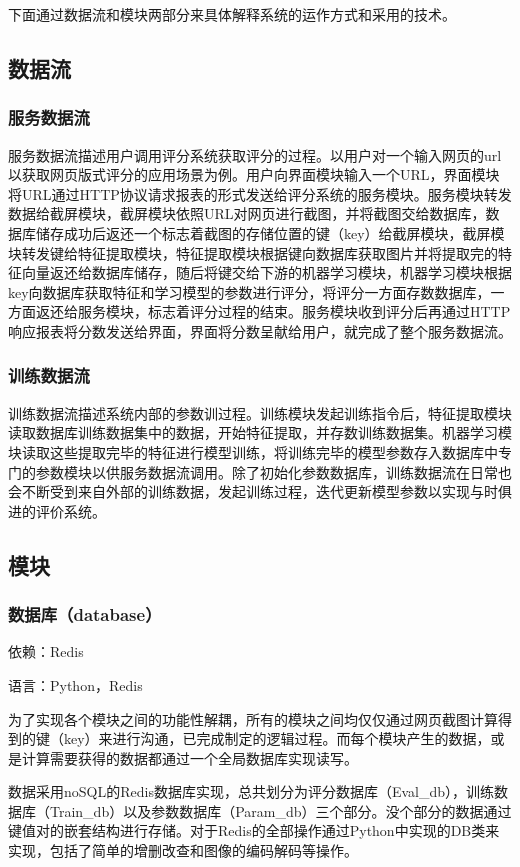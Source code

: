 下面通过数据流和模块两部分来具体解释系统的运作方式和采用的技术。

\subsection{数据流}

\subsubsection{服务数据流}
服务数据流描述用户调用评分系统获取评分的过程。以用户对一个输入网页的url以获取网页版式评分的应用场景为例。用户向界面模块输入一个URL，界面模块将URL通过HTTP协议请求报表的形式发送给评分系统的服务模块。服务模块转发数据给截屏模块，截屏模块依照URL对网页进行截图，并将截图交给数据库，数据库储存成功后返还一个标志着截图的存储位置的键（key）给截屏模块，截屏模块转发键给特征提取模块，特征提取模块根据键向数据库获取图片并将提取完的特征向量返还给数据库储存，随后将键交给下游的机器学习模块，机器学习模块根据key向数据库获取特征和学习模型的参数进行评分，将评分一方面存数数据库，一方面返还给服务模块，标志着评分过程的结束。服务模块收到评分后再通过HTTP响应报表将分数发送给界面，界面将分数呈献给用户，就完成了整个服务数据流。

\subsubsection{训练数据流}
训练数据流描述系统内部的参数训过程。训练模块发起训练指令后，特征提取模块读取数据库训练数据集中的数据，开始特征提取，并存数训练数据集。机器学习模块读取这些提取完毕的特征进行模型训练，将训练完毕的模型参数存入数据库中专门的参数模块以供服务数据流调用。除了初始化参数数据库，训练数据流在日常也会不断受到来自外部的训练数据，发起训练过程，迭代更新模型参数以实现与时俱进的评价系统。

\subsection{模块}
\subsubsection{数据库（database）}
依赖：Redis

语言：Python，Redis

为了实现各个模块之间的功能性解耦，所有的模块之间均仅仅通过网页截图计算得到的键（key）来进行沟通，已完成制定的逻辑过程。而每个模块产生的数据，或是计算需要获得的数据都通过一个全局数据库实现读写。

数据采用noSQL的Redis数据库实现，总共划分为评分数据库（Eval\_db），训练数据库（Train\_db）以及参数数据库（Param\_db）三个部分。没个部分的数据通过键值对的嵌套结构进行存储。对于Redis的全部操作通过Python中实现的DB类来实现，包括了简单的增删改查和图像的编码解码等操作。

